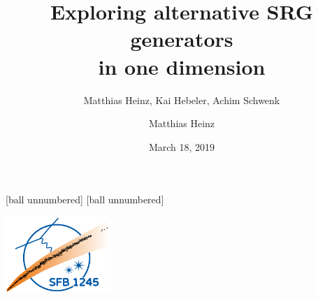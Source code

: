 \documentclass[accentcolor=tud2c,usenames,dvipsnames,colorbacktitle,inverttitle,landscape,german,presentation,t]{tudbeamer}
\begin{document}
  \title{Exploring alternative SRG generators \\ in one dimension}
  \subtitle{\small{Matthias Heinz, Kai Hebeler, Achim Schwenk}}
  \author{Matthias Heinz}
  \date{March 18, 2019}

  [ball unnumbered]
  [ball unnumbered]


  \begin{titleframe}
    \begin{center}
      \includegraphics[width=0.3\textwidth]{figures/01/logo_sfb1245}
    \end{center}
  \end{titleframe}
\end{document}
